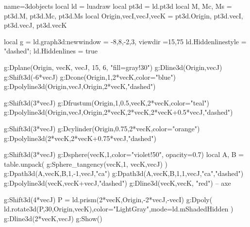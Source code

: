 \documentclass{standalone}
\begin{document}
\begin{luadraw}{name=3dobjects}
local ld = luadraw
local pt3d = ld.pt3d
local M, Mc, Ms = pt3d.M, pt3d.Mc, pt3d.Ms
local Origin,vecI,vecJ,vecK = pt3d.Origin, pt3d.vecI, pt3d.vecJ, pt3d.vecK

local g = ld.graph3d:new{window = {-8,8,-2,3}, viewdir ={15,75} }
ld.Hiddenlinestyle = "dashed"; ld.Hiddenlines = true

g:Dplane({Origin, vecK}, vecJ, 15, 6, "fill=gray!30")
g:Dline3d({Origin,vecJ})
g:Shift3d(-6*vecJ)
g:Dcone(Origin,1,2*vecK,{color="blue"})
g:Dpolyline3d({{Origin,vecJ},{Origin,2*vecK}},"dashed")

g:Shift3d(3*vecJ)
g:Dfrustum(Origin,1,0.5,vecK,2*vecK,{color="teal"})
g:Dpolyline3d({{Origin,vecJ},{Origin,2*vecK},{2*vecK,2*vecK+0.5*vecJ}},"dashed")

g:Shift3d(3*vecJ)
g:Dcylinder(Origin,0.75,2*vecK,{color="orange"})
g:Dpolyline3d({2*vecK,2*vecK+0.75*vecJ},"dashed")

g:Shift3d(3*vecJ)
g:Dsphere(vecK,1,{color="violet!50", opacity=0.7})
local A, B = table.unpack( g:Sphere_tangency(vecK,1, {vecK,vecJ}) )
g:Dpath3d({A,vecK,B,1,-1,vecJ,"ca"})
g:Dpath3d({A,vecK,B,1,1,vecJ,"ca"},"dashed")
g:Dpolyline3d({vecK,vecK+vecJ},"dashed")
g:Dline3d({vecK,vecK}, "red") -- axe

g:Shift3d(4*vecJ)
P = ld.prism({2*vecK,Origin,-2*vecJ},-vecI)
g:Dpoly( ld.rotate3d(P,30,{Origin,vecK}),{color="LightGray",mode=ld.mShadedHidden} )
g:Dline3d({2*vecK,vecJ})
g:Show()
\end{luadraw}
\end{document}
